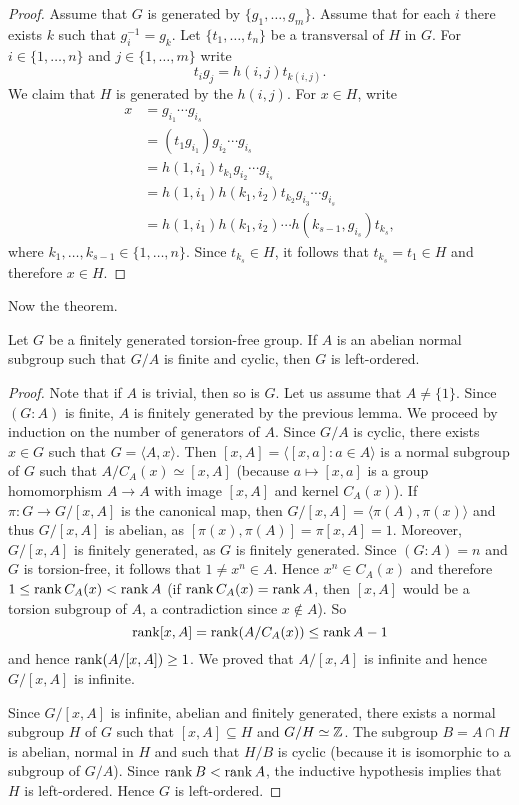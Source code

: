 \begin{proof}
	Assume that $G$ is generated by $\{g_1,\dots,g_m\}$. Assume that
	for each $i$ there exists $k$ such that $g_i^{-1}=g_k$. Let $\{t_1,\dots,t_n\}$ be
	a transversal of $H$ in $G$. For $i\in\{1,\dots,n\}$ and 
	$j\in\{1,\dots,m\}$ write 
	\[
		t_ig_j=h(i,j)t_{k(i,j)}.
	\]
	We claim that $H$ is generated by the $h(i,j)$. For $x\in H$, write 
	\begin{align*}
	x &=g_{i_1}\cdots g_{i_s}\\
	&= (t_1g_{i_1})g_{i_2}\cdots g_{i_s}\\
	&= h(1,i_1)t_{k_1}g_{i_2}\cdots g_{i_s}\\
	&= h(1,i_1)h(k_1,i_2)t_{k_2}g_{i_3}\cdots g_{i_s}\\
	&= h(1,i_1)h(k_1,i_2)\cdots h(k_{s-1},g_{i_s})t_{k_s},
	\end{align*}
	where $k_1,\dots,k_{s-1}\in\{1,\dots,n\}$. Since $t_{k_s}\in H$, it follows that 
	$t_{k_s}=t_1\in H$ and therefore $x\in H$.
\end{proof}

Now the theorem.

\begin{theorem}
	Let $G$ be a finitely generated torsion-free group. If $A$ is an abelian normal
	subgroup such that $G/A$ is finite and cyclic, then $G$ is left-ordered. 
\end{theorem}

\begin{proof}
	Note that if $A$ is trivial, then so is $G$. Let us assume that $A\ne\{1\}$. 
    Since $(G:A)$ is finite, $A$ is finitely generated by the previous lemma. 
    We proceed by induction on the number of generators of $A$. Since 
    $G/A$ is cyclic, there exists $x\in G$ such that $G=\langle A,x\rangle$. Then
    $[x,A]=\langle [x,a]:a\in A\rangle$ is a normal subgroup of $G$ such that 
    $A/C_A(x)\simeq [x,A]$ (because $a\mapsto [x,a]$ is a group homomorphism $A\to A$
    with image $[x,A]$ and kernel $C_A(x)$). If $\pi\colon G\to G/[x,A]$ is the canonical map, then
    $G/[x,A]=\langle \pi(A),\pi(x)\rangle$ and thus $G/[x,A]$ is abelian, as 
    $[\pi(x),\pi(A)]=\pi[x,A]=1$. Moreover, $G/[x,A]$ is finitely generated, as $G$
    is finitely generated. Since $(G:A)=n$ and $G$ is torsion-free, it follows that 
    $1\ne x^n\in A$. Hence $x^n\in C_A(x)$ and therefore $1\leq \operatorname{rank} C_A(x)<\operatorname{rank} A$ (if $\operatorname{rank}
    C_A(x)=\operatorname{rank} A$, then $[x,A]$ would be a torsion subgroup of $A$, a contradiction
    since $x\not\in A$). So 
    \[
    \operatorname{rank}[x,A]=\operatorname{rank} (A/C_A(x))\leq\operatorname{rank} A-1
    \]
    and hence $\operatorname{rank} (A/[x,A])\geq 1$. We proved that $A/[x,A]$ is infinite and hence 
    $G/[x,A]$ is infinite. 

    Since $G/[x,A]$ is infinite, abelian and finitely generated, there exists a normal subgroup
    $H$ of $G$ such that $[x,A]\subseteq H$ and $G/H\simeq\mathbb{Z}$. The subgroup 
    $B=A\cap H$ is abelian, normal in $H$ and such that $H/B$ is cyclic
    (because it is isomorphic to a subgroup of $G/A$). Since $\operatorname{rank} B<\operatorname{rank} A$, the inductive hypothesis implies that $H$ is left-ordered. Hence $G$ is left-ordered. 
\end{proof}

